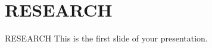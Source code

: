 \section{RESEARCH}
\begin{frame}{RESEARCH}
  This is the first slide of your presentation.
\end{frame}